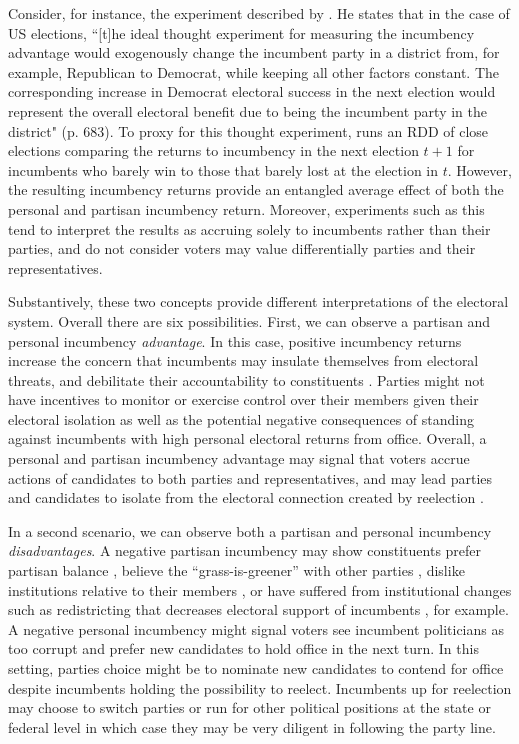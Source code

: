 \documentclass[12pt]{amsart}
\numberwithin{equation}{section}
\theoremstyle{definition}
\theoremstyle{definition}
\theoremstyle{definition}
\begin{document}
Consider, for instance, the experiment described by \citet{lee_2008}. He states that in the case of US elections, ``[t]he ideal thought experiment for measuring the incumbency advantage would exogenously change the incumbent party in a district from, for example, Republican to Democrat, while keeping all other factors constant. The corresponding increase in Democrat electoral success in the next election would represent the overall electoral benefit due to being the incumbent party in the district" (p. 683). To proxy for this thought experiment, \citet{lee_2008} runs an RDD of close elections comparing the returns to incumbency in the next election $t+1$ for incumbents who barely win to those that barely lost at the election in $t$. However, the resulting incumbency returns provide an entangled average effect of both the personal and partisan incumbency return. Moreover, experiments such as this tend to interpret the results as accruing solely to incumbents rather than their parties, and do not consider voters may value differentially parties and their representatives. 

Substantively, these two concepts provide different interpretations of the electoral system. Overall there are six possibilities. First, we can observe a  partisan and personal incumbency \emph{advantage}. In this case, positive incumbency returns increase the concern that incumbents may insulate themselves from electoral threats, and debilitate their accountability to constituents \citep{ashworth_etal_2019, cox_katz_2002}. Parties might not have incentives to monitor or exercise control over their members given their electoral isolation as well as the potential negative consequences of standing against incumbents with high personal electoral returns from office. Overall, a personal and partisan incumbency advantage may signal that voters accrue actions of candidates to both parties and representatives, and may lead parties and candidates to isolate from the electoral connection created by reelection \citep{mayhew_1974}. 

 In a second scenario, we can observe both a partisan and personal incumbency \emph{disadvantages}. A negative partisan incumbency may show constituents prefer partisan balance \citep{folke_snyder_2012}, believe the ``grass-is-greener'' with other parties \citep{bhatia_turan_2013}, dislike institutions relative to their members \citep{parker_davidson_1979}, or have suffered from institutional changes such as redistricting that decreases electoral support of incumbents \citep{ansolabehere_snyder_2000, desposato_petrocik_2003}, for example. A negative personal incumbency might signal voters see incumbent politicians as too corrupt and prefer new candidates to hold office in the next turn. In this setting, parties choice might be to nominate new candidates to contend for office despite incumbents holding the possibility to reelect. Incumbents up for reelection may choose to switch parties or run for other political positions at the state or federal level in which case they may be very diligent in following the party line. 
  
\end{document}
